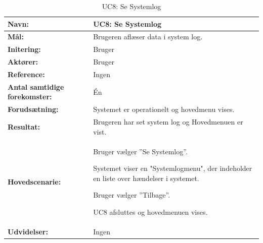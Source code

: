 \begin{table}[h]
\begin{tabularx}{\textwidth}{| >{\raggedright\arraybackslash}p{3.3 cm} | >{\raggedright\arraybackslash}X |} \hline

\textbf{Navn:} 						& UC8: Se Systemlog\\ \hline
\textbf{Mål:}						& Brugeren aflæser data i system log. \\ \hline
\textbf{Initering:}					& Bruger \\ \hline
\textbf{Aktører:} 					& Bruger \\ \hline
\textbf{Reference:} 				& Ingen \\ \hline
\textbf{Antal samtidige forekomster:} & Én \\ \hline
\textbf{Forudsætning:} 				& Systemet er operationelt og hovedmenu vises. \\ \hline
\textbf{Resultat:}					& Brugeren har set system log og Hovedmenuen er vist. \\ \hline
\textbf{Hovedscenarie:}				& 

\begin{packed_enum}
\item Bruger vælger ”Se Systemlog”.
\item Systemet viser en "Systemlogmenu", der indeholder en liste over hændelser i systemet.
\item Bruger vælger ”Tilbage”.
\item UC8 afsluttes og hovedmenuen vises. 
\end{packed_enum} \\ \hline
\textbf{Udvidelser:}				&  
Ingen
\\ \hline
\end{tabularx}
\caption{UC8: Se Systemlog}
\label{tbl:UC8}
\end{table}

